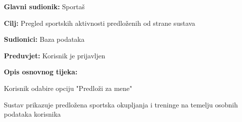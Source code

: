 					\noindent {}
					\begin{packed_item}
						
						\item \textbf{Glavni sudionik: }Sportaš
						\item  \textbf{Cilj:} Pregled sportskih aktivnosti predloženih od strane sustava
						\item  \textbf{Sudionici:} Baza podataka
						\item  \textbf{Preduvjet:} Korisnik je prijavljen
						\item  \textbf{Opis osnovnog tijeka:}
						
						\item[] \begin{packed_enum}
							
							\item Korisnik odabire opciju "Predloži za mene"
							\item Sustav prikazuje predložena sportska okupljanja i treninge na temelju osobnih podataka korisnika
							
						\end{packed_enum}
						
					\end{packed_item}
					
					
					
